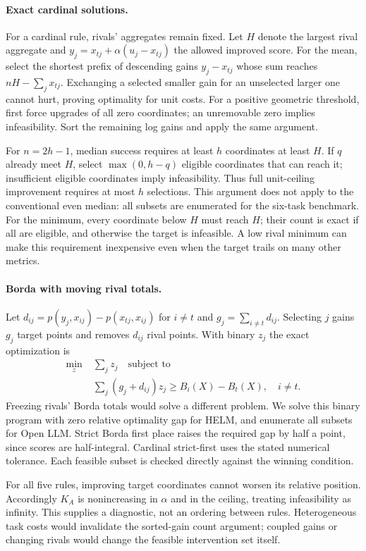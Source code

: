 \paragraph{Exact cardinal solutions.}
For a cardinal rule, rivals' aggregates remain fixed. Let $H$ denote the largest rival aggregate and $y_j=x_{tj}+\alpha(u_j-x_{tj})$ the allowed improved score. For the mean, select the shortest prefix of descending gains $y_j-x_{tj}$ whose sum reaches $nH-\sum_j x_{tj}$. Exchanging a selected smaller gain for an unselected larger one cannot hurt, proving optimality for unit costs. For a positive geometric threshold, first force upgrades of all zero coordinates; an unremovable zero implies infeasibility. Sort the remaining log gains and apply the same argument.

For $n=2h-1$, median success requires at least $h$ coordinates at least $H$. If $q$ already meet $H$, select $\max(0,h-q)$ eligible coordinates that can reach it; insufficient eligible coordinates imply infeasibility. Thus full unit-ceiling improvement requires at most $h$ selections. This argument does not apply to the conventional even median: all subsets are enumerated for the six-task benchmark. For the minimum, every coordinate below $H$ must reach $H$; their count is exact if all are eligible, and otherwise the target is infeasible. A low rival minimum can make this requirement inexpensive even when the target trails on many other metrics.

\paragraph{Borda with moving rival totals.}
Let $d_{ij}=p(y_j,x_{ij})-p(x_{tj},x_{ij})$ for $i\ne t$ and $g_j=\sum_{i\ne t}d_{ij}$. Selecting $j$ gains $g_j$ target points and removes $d_{ij}$ rival points. With binary $z_j$ the exact optimization is
\begin{align}
 \min_z\;&\sum_j z_j \quad \text{subject to}\nonumber\\
 &\sum_j(g_j+d_{ij})z_j\geq B_i(X)-B_t(X),\quad i\ne t.
 \label{eq:borda}
\end{align}
Freezing rivals' Borda totals would solve a different problem. We solve this binary program with zero relative optimality gap for HELM, and enumerate all subsets for Open LLM. Strict Borda first place raises the required gap by half a point, since scores are half-integral. Cardinal strict-first uses the stated numerical tolerance. Each feasible subset is checked directly against the winning condition.

For all five rules, improving target coordinates cannot worsen its relative position. Accordingly $K_A$ is nonincreasing in $\alpha$ and in the ceiling, treating infeasibility as infinity. This supplies a diagnostic, not an ordering between rules. Heterogeneous task costs would invalidate the sorted-gain count argument; coupled gains or changing rivals would change the feasible intervention set itself.
